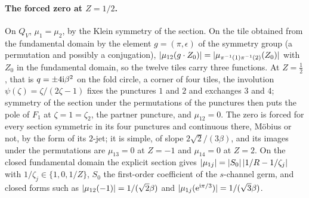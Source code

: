 \paragraph{The forced zero at \texorpdfstring{$Z = 1 / 2$}{Z = 1/2}.}
On $Q_V$, $\mu_1 = \mu_2$, by the Klein symmetry of the section.
On the tile obtained from the fundamental domain by the element $g = (\pi, \epsilon)$ of the symmetry group (a permutation and possibly a conjugation), ${|\mu_{12}(g \cdot Z_0)|} = {|\mu_{\pi^{-1}(1) \pi^{-1}(2)}(Z_0)|}$ with $Z_0$ in the fundamental domain, so the twelve tiles carry three functions.
At $Z = \tfrac{1}{2}$, that is $q = \pm 4 \mathrm{i} \beta^2$ on the fold circle, a corner of four tiles, the involution $\psi(\zeta) = \zeta / (2 \zeta - 1)$ fixes the punctures $1$ and $2$ and exchanges $3$ and $4$; symmetry of the section under the permutations of the punctures then puts the pole of $F_1$ at $\zeta = 1 = \zeta_2$, the partner puncture, and $\mu_{12} = 0$.
The zero is forced for every section symmetric in its four punctures and continuous there, Möbius or not, by the form of its $2$-jet; it is simple, of slope $2 \sqrt 2 / (3 \beta)$, and its images under the permutations are $\mu_{13} = 0$ at $Z = - 1$ and $\mu_{14} = 0$ at $Z = 2$.
On the closed fundamental domain the explicit section gives ${|\mu_{1j}|} = {|S_0|} \, {|1 / R - 1 / \zeta_j|}$ with $1 / \zeta_j \in \{ 1, 0, 1 / Z \}$, $S_0$ the first-order coefficient of the $s$-channel germ, and closed forms such as ${|\mu_{12}(-1)|} = 1 / (\sqrt 2 \beta)$ and ${|\mu_{1j}(\mathrm{e}^{\mathrm{i} \pi / 3})|} = 1 / (\sqrt 3 \beta)$.

